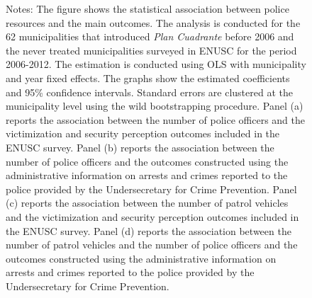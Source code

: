 \begin{figure}[h!]
\begin{minipage}{0.99\textwidth}
    \footnotesize Notes: The figure shows the statistical association between police resources and the main outcomes. The analysis is conducted for the 62 municipalities that introduced \emph{Plan Cuadrante} before 2006 and the never treated municipalities surveyed in ENUSC for the period 2006-2012. The estimation is conducted using OLS with municipality and year fixed effects. The graphs show the estimated coefficients and 95\% confidence intervals. Standard errors are clustered at the municipality level using the wild bootstrapping procedure. Panel (a) reports the association between the number of police officers and the victimization and security perception outcomes included in the ENUSC survey. Panel (b) reports the association between the number of police officers and the outcomes constructed using the administrative information on arrests and crimes reported to the police provided by the Undersecretary for Crime Prevention. Panel (c) reports the association between the number of patrol vehicles and the victimization and security perception outcomes included in the ENUSC survey. Panel (d) reports the association between the number of patrol vehicles and the number of police officers and the outcomes constructed using the administrative information on arrests and crimes reported to the police provided by the Undersecretary for Crime Prevention. 
    \end{minipage}
\end{figure}


